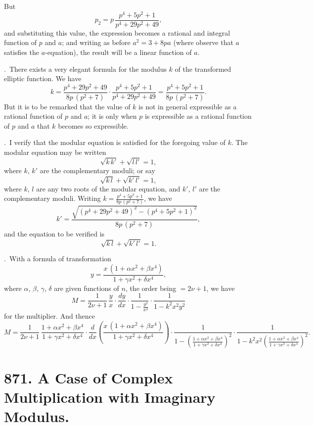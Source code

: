 \documentclass[12pt,a4paper]{article}
\theoremstyle{plain}
\begin{document}
But
\[
p_{2} = p\,\frac{p^{4} + 5p^{2} + 1}{p^{4} + 29p^{2} + 49},
\]
and substituting this value, the expression becomes a rational and integral function of $p$ and $a$; and writing as before $a^{2} = 3 + 8pa$ (where observe that $a$ satisfies the $a$-equation), the result will be a linear function of $a$.

\bigskip{}.\ There exists a very elegant formula for the modulus $k$ of the transformed elliptic function. We have
\[
k = \frac{p^{4} + 29p^{2} + 49}{8p\,(p^{2}+7)} \cdot \frac{p^{4} + 5p^{2} + 1}{p^{4} + 29p^{2} + 49} = \frac{p^{4} + 5p^{2} + 1}{8p\,(p^{2}+7)}.
\]
But it is to be remarked that the value of $k$ is not in general expressible as a rational function of $p$ and $a$; it is only when $p$ is expressible as a rational function of $p$ and $a$ that $k$ becomes so expressible.

\bigskip{}.\ I verify that the modular equation is satisfied for the foregoing value of $k$. The modular equation may be written
\[
\sqrt{k\,k'} + \sqrt{l\,l'} = 1,
\]
where $k$, $k'$ are the complementary moduli; or say
\[
\sqrt{k\,l} + \sqrt{k'\,l'} = 1,
\]
where $k$, $l$ are any two roots of the modular equation, and $k'$, $l'$ are the complementary moduli. Writing $k = \frac{p^{4} + 5p^{2} + 1}{8p\,(p^{2}+7)}$, we have
\[
k' = \frac{\sqrt{(p^{4} + 29p^{2} + 49)^{2} - (p^{4} + 5p^{2} + 1)^{2}}}{8p\,(p^{2}+7)},
\]
and the equation to be verified is
\[
\sqrt{k\,l} + \sqrt{k'\,l'} = 1.
\]

\bigskip{}.\ With a formula of transformation
\[
y = \frac{x\,(1 + \alpha x^{2} + \beta x^{4})}{1 + \gamma x^{2} + \delta x^{4}},
\]
where $\alpha$, $\beta$, $\gamma$, $\delta$ are given functions of $n$, the order being $= 2\nu + 1$, we have
\[
M = \frac{1}{2\nu+1}\,\frac{y}{x} \cdot \frac{dy}{dx} \cdot \frac{1}{1 - \frac{y^{2}}{x^{2}}} \cdot \frac{1}{1 - k^{2}x^{2}y^{2}}
\]
for the multiplier. And thence
\[
M = \frac{1}{2\nu+1}\,\frac{1 + \alpha x^{2} + \beta x^{4}}{1 + \gamma x^{2} + \delta x^{4}} \cdot \frac{d}{dx}\left(\frac{x\,(1 + \alpha x^{2} + \beta x^{4})}{1 + \gamma x^{2} + \delta x^{4}}\right) \cdot \frac{1}{1 - \left(\frac{1 + \alpha x^{2} + \beta x^{4}}{1 + \gamma x^{2} + \delta x^{4}}\right)^{2}} \cdot \frac{1}{1 - k^{2}x^{2}\left(\frac{1 + \alpha x^{2} + \beta x^{4}}{1 + \gamma x^{2} + \delta x^{4}}\right)^{2}}.
\]

\newpage
\section[871]{871. A Case of Complex Multiplication with Imaginary Modulus.}
\label{sec:871}
\end{document}
